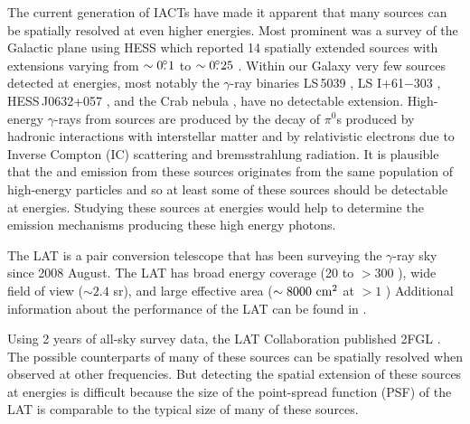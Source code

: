 The current generation of \acp{IACT} have made it apparent that many
sources can be spatially resolved at even higher energies.  Most prominent
was a survey of the Galactic plane using \ac{HESS} which reported 14
spatially extended sources with extensions varying from $\sim0\mbox{$.\!\!^\circ$}1$
to $\sim0\mbox{$.\!\!^\circ$}25$ \citep{aharonian_2006a_h.e.s.s.-survey}.  Within our
Galaxy very few sources detected at \tev energies, most notably the
$\gamma$-ray binaries LS\,5039 \citep{aharonian_2006a_orbital-modulation},
LS I+61$-$303 \citep{albert_2006a_variable-very-high-energy,
acciari_2011a_veritas-observations}, HESS\,J0632+057
\citep{aharonian_2007a_discovery-point-like}, and the Crab nebula
\citep{weekes_1989a_observation-gamma}, have no detectable extension.
High-energy $\gamma$-rays from \tev sources are produced by the decay
of $\pi^0$s produced by hadronic interactions with interstellar matter
and by relativistic electrons due to Inverse Compton (IC) scattering and
bremsstrahlung radiation.  It is plausible that the \gev and \tev emission
from these sources originates from the same population of high-energy
particles and so at least some of these sources should be detectable at
\gev energies.  Studying these \tev sources at \gev energies would help
to determine the emission mechanisms producing these high energy photons.

The LAT is a pair conversion telescope that has been surveying
the $\gamma$-ray sky since 2008 August.  The LAT has broad energy
coverage (20 \mev to $>300$ \gev), wide field of view ($\sim 2.4$
sr), and large effective area ($\sim 8000\ \cm^2$ at $>1$ \gev)
Additional information about the performance of the LAT can be found
in \cite{atwood_2009a_large-telescope}.

Using 2 years of all-sky survey data, the LAT Collaboration published
2FGL \citep[2FGL,][]{nolan_2012_fermi-large}.  The possible counterparts
of many of these sources can be spatially resolved when observed at other
frequencies. But detecting the spatial extension of these sources at \gev
energies is difficult because the size of the point-spread function (PSF)
of the LAT is comparable to the typical size of many of these sources.

